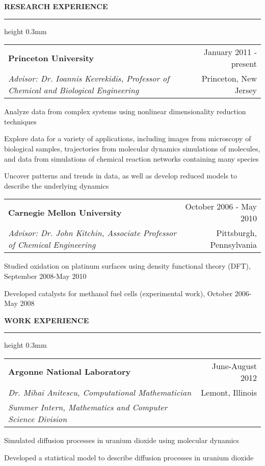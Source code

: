 \documentclass[letterpaper,10pt]{article}
\makeatletter
\newenvironment{itemize*}
  {\begin{itemize}
    \setlength{\parskip}{-2pt}}
  {\end{itemize}}
\newcommand{\cvheading}[1]{
\vspace{0.11in}
\noindent
\MakeUppercase{\bf #1}
\vspace{0.06in}
{\hrule height 0.3mm}
\vspace{0.06in}}
\newcommand{\workplace}[4]{
\noindent
\vspace{0.012in}
\begin{tabular*}{1.0\textwidth}{@{\extracolsep{\fill}} l r}
{\bf #1} & #2\\
{\em #3} & #4\\
\end{tabular*}
\vspace{-0.15in}
}
\newcommand{\workplaceadvisor}[5]{
\noindent
\vspace{0.012in}
\begin{tabular*}{1.0\textwidth}{@{\extracolsep{\fill}} l r}
{\bf #1} & #2\\
{\em #3} & #4\\
{\em #5} & \\
\end{tabular*}
\vspace{-0.15in}
}
\newcommand{\spacing}[0]{
\vspace{0.1in}
}
\makeatother
\begin{document}
\cvheading{Research Experience}
\workplace{Princeton University}{January 2011 - present}{Advisor: Dr. Ioannis Kevrekidis, Professor of Chemical and Biological Engineering}{Princeton, New Jersey}
\begin{itemize*}
\item Analyze data from complex systems using nonlinear dimensionality reduction techniques%
\item Explore data for a variety of applications, including images from microscopy of biological samples, trajectories from molecular dynamics simulations of molecules, and data from simulations of chemical reaction networks containing many species
\item Uncover patterns and trends in data, as well as develop reduced models to describe the underlying dynamics
\end{itemize*}

\spacing

\workplace{Carnegie Mellon University}{October 2006 - May 2010}{Advisor: Dr. John Kitchin, Associate Professor of Chemical Engineering}{Pittsburgh, Pennsylvania}
\begin{itemize*}
\item Studied oxidation on platinum surfaces using density functional theory (DFT), September 2008-May 2010
\item Developed catalysts for methanol fuel cells (experimental work), October 2006-May 2008
\end{itemize*}


\cvheading{Work Experience}
\workplaceadvisor{Argonne National Laboratory}{June-August 2012}{Dr. Mihai Anitescu, Computational Mathematician}{Lemont, Illinois}{Summer Intern, Mathematics and Computer Science Division}
\begin{itemize*}
\item Simulated diffusion processes in uranium dioxide using molecular dynamics
\item Developed a statistical model to describe diffusion processes in uranium dioxide
\end{itemize*}
\end{document}
